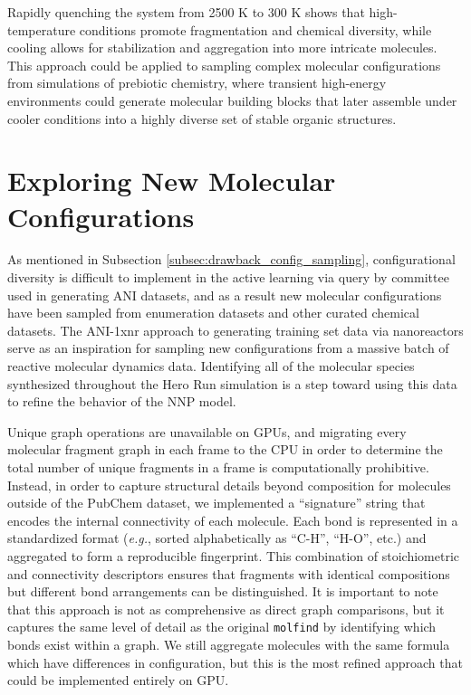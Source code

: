 Rapidly quenching the system from 2500 K to 300 K shows that high-temperature conditions promote fragmentation and chemical diversity, while cooling allows for stabilization and aggregation into more intricate molecules.
This approach could be applied to sampling complex molecular configurations from simulations of prebiotic chemistry, where transient high-energy environments could generate molecular building blocks that later assemble under cooler conditions into a highly diverse set of stable organic structures.

\section{Exploring New Molecular Configurations}
\label{sec:exploring_new_mol_configs}

As mentioned in Subsection \ref{subsec:drawback_config_sampling}, configurational diversity is difficult to implement in the active learning via query by committee used in generating ANI datasets, and as a result new molecular configurations have been sampled from enumeration datasets and other curated chemical datasets.
The ANI-1xnr \cite{ani-1xnr} approach to generating training set data via nanoreactors serve as an inspiration for sampling new configurations from a massive batch of reactive molecular dynamics data.
Identifying all of the molecular species synthesized throughout the Hero Run simulation is a step toward using this data to refine the behavior of the NNP model.

Unique graph operations are unavailable on GPUs, and migrating every molecular fragment graph in each frame to the CPU in order to determine the total number of unique fragments in a frame is computationally prohibitive.
Instead, in order to capture structural details beyond composition for molecules outside of the PubChem dataset, we implemented a “signature” string that encodes the internal connectivity of each molecule. 
Each bond is represented in a standardized format (\textit{e.g.}, sorted alphabetically as ``C-H'', ``H-O'', etc.) and aggregated to form a reproducible fingerprint. 
This combination of stoichiometric and connectivity descriptors ensures that fragments with identical compositions but different bond arrangements can be distinguished. 
It is important to note that this approach is not as comprehensive as direct graph comparisons, but it captures the same level of detail as the original \verb|molfind| by identifying which bonds exist within a graph. 
We still aggregate molecules with the same formula which have differences in configuration, but this is the most refined approach that could be implemented entirely on GPU.

